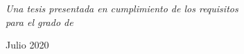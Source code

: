 \documentclass[
	12pt, %
	spanish, %
	es-tabla,
	singlespacing, %
	headsepline, %
	]{MastersDoctoralThesis} %
\begin{document}
\begin{titlepage}
\begin{center}
\large \textit{Una tesis presentada en cumplimiento de los requisitos \\para el grado de \degreename}\\[0.3cm] %
 
\vfill

{\large Julio 2020}\\[4cm] %
 
\vfill
\end{center}
\end{titlepage}



 
 
\end{document}
